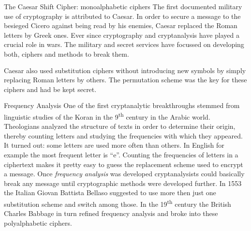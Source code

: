 \documentclass[final,hyperref={pdfpagelabels=false}]{beamer}
\begin{document}
\begin{frame}{}
\begin{columns}[t]
\begin{column}{.3\linewidth}
\begin{block}{The Caesar Shift Cipher: monoalphabetic ciphers}
          The first documented military use of cryptography is attributed to Caesar. In order to secure a message to the besieged Cicero against being read by his enemies, Caesar replaced the Roman letters by Greek ones. Ever since cryptography and cryptanalysis have played a crucial role in wars. The military and secret services have focussed on developing both, ciphers and methods to break them. \par
          Caesar also used substitution ciphers without introducing new symbols by simply replacing Roman letters by others. The permutation scheme was the key for these ciphers and had be kept secret.
        \end{block}

        \begin{block}{Frequency Analysis}
          One of the first cryptanalytic breakthroughs stemmed from linguistic studies of the Koran in the 9\textsuperscript{th} century in the Arabic world. Theologians analyzed the structure of texts in order to determine their origin, thereby counting letters and studying the frequencies with which they appeared. It turned out: some letters are used more often than others. In English for example the most frequent letter is ``e''. Counting the frequencies of letters in a ciphertext makes it pretty easy to guess the replacement scheme used to encrypt a message. Once {\em frequency analysis} was developed cryptanalysists could basically break any message until cryptographic methods were developed further. In 1553 the Italian Giovan Battista Bellaso suggested to use more then just one substitution scheme and switch among those. In the 19\textsuperscript{th} century the British Charles Babbage in turn refined frequency analysis and broke into these polyalphabetic ciphers.
        \end{block}


\end{column}
\end{columns}
\end{frame}
\end{document}
